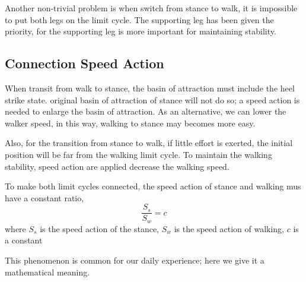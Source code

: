Another non-trivial problem is when switch from stance to walk, it is impossible to put both legs on the limit cycle.
The supporting leg has been given the priority, for the supporting leg is more important for maintaining stability.





\subsection{Connection Speed Action}
When transit from walk to stance, the basin of attraction must include the heel strike state.
original basin of attraction of stance will not do so; a speed action is needed to enlarge the basin of attraction.
As an alternative, we can lower the walker speed, in this way, walking to stance may becomes more easy.

Also, for the transition from stance to walk, if little effort is exerted, the initial position will be far from the walking limit cycle.
To maintain the walking stability, speed action are applied decrease the walking speed.

To make both limit cycles connected, the speed action of stance and walking mus have a constant ratio,
\[
\frac{S_s}{S_w}=c
\]
where $S_s$ is the speed action of the stance, $S_w$ is the speed action of walking,
$c$ is a constant

This phenomenon is common for our daily experience; here we give it a mathematical meaning.

























